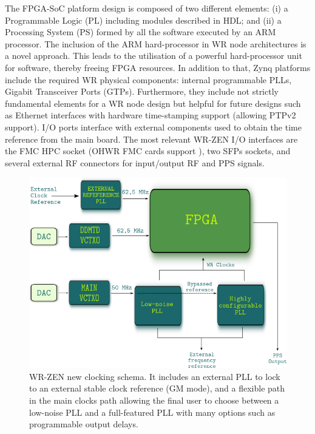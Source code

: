 The FPGA-SoC platform design is composed of two different elements: (i) a
Programmable Logic (PL) including modules described in HDL; and (ii) a
Processing System (PS) formed by all the software executed by an ARM
processor.  The inclusion of the ARM hard-processor in WR node
architectures is a novel approach.  This leads to the utilisation of a powerful
hard-processor unit for software, thereby freeing FPGA resources. In addition
to that, Zynq platforms include the required WR physical components: 
internal programmable PLLs, Gigabit Transceiver Ports (GTPs).
Furthermore, they include not strictly fundamental elements for a WR node design but helpful for
future designs such as Ethernet interfaces with hardware time-stamping support
(allowing PTPv2 support). I/O ports interface with external components used to obtain the time reference from the
main board. The most relevant WR-ZEN I/O interfaces are the FMC HPC
socket (OHWR FMC cards support
\cite{ohwr:fmc-fine-delay}), two SFPs sockets, and
several external RF connectors for input/output RF and PPS signals.

\begin{figure} \centering
	\includegraphics[width=0.7\linewidth]{img/zenclkschema} \caption[WR-ZEN
	clocking schema]{WR-ZEN new clocking schema. 
	It includes an external PLL to lock to an external
	stable clock reference (GM mode), and a flexible path in the main
	clocks path allowing the final user to choose between a low-noise PLL
	and a full-featured PLL with many options such as programmable output
delays.} \label{fig:zenclkschema} \end{figure}

